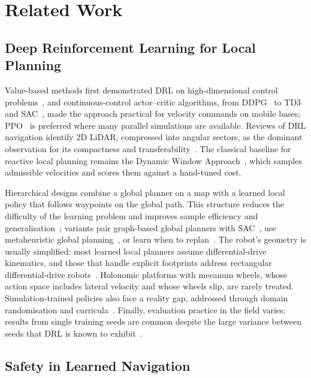 \documentclass[sensors,article,submit,moreauthors]{Definitions/mdpi}
\begin{document}
\section{Related Work}\label{sec:related}

\subsection{Deep Reinforcement Learning for Local Planning}

Value-based methods first demonstrated DRL on high-dimensional control problems~\citep{mnih2015dqn}, and continuous-control actor--critic algorithms, from DDPG~\citep{lillicrap2016ddpg} to TD3~\citep{fujimoto2018td3} and SAC~\citep{haarnoja2018sac}, made the approach practical for velocity commands on mobile bases; PPO~\citep{schulman2017ppo} is preferred where many parallel simulations are available. Reviews of DRL navigation identify 2D LiDAR, compressed into angular sectors, as the dominant observation for its compactness and transferability~\citep{le2024review,liu2024sac}. The classical baseline for reactive local planning remains the Dynamic Window Approach~\citep{fox1997dwa}, which samples admissible velocities and scores them against a hand-tuned cost.

Hierarchical designs combine a global planner on a map with a learned local policy that follows waypoints on the global path. This structure reduces the difficulty of the learning problem and improves sample efficiency and generalisation~\citep{zhu2023hierarchical}; variants pair graph-based global planners with SAC~\citep{kolomeytsev2025hybrid}, use metaheuristic global planning~\citep{zhao2025hierarchical}, or learn when to replan~\citep{honda2024replan}. The robot's geometry is usually simplified: most learned local planners assume differential-drive kinematics, and those that handle explicit footprints address rectangular differential-drive robots~\citep{zhang2025drldclp}. Holonomic platforms with mecanum wheels, whose action space includes lateral velocity and whose wheels slip, are rarely treated. Simulation-trained policies also face a reality gap, addressed through domain randomisation and curricula~\citep{zhao2020sim2real}. Finally, evaluation practice in the field varies: results from single training seeds are common despite the large variance between seeds that DRL is known to exhibit~\citep{henderson2018matters,agarwal2021precipice,cancelliere2025eval}.

\subsection{Safety in Learned Navigation}
\end{document}
